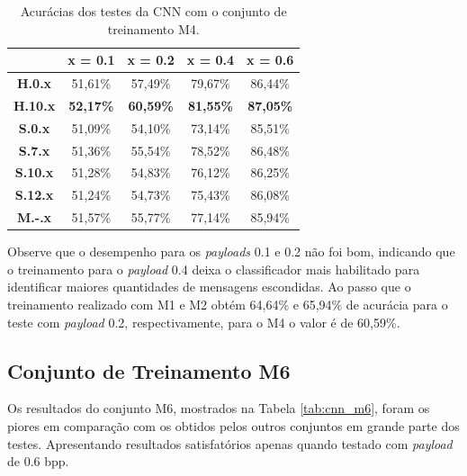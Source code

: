 \begin{table}[!htb]
\centering
\begin{tabular}{c|c|c|c|c|}
\cline{2-5}
\textbf{}                             & \textbf{x = 0.1} & \textbf{x = 0.2} & \textbf{x = 0.4} & \textbf{x = 0.6} \\ \hline
\multicolumn{1}{|c|}{\textbf{H.0.x}}  & 51,61\%          & 57,49\%          & 79,67\%          & 86,44\%          \\ \hline
\multicolumn{1}{|c|}{\textbf{H.10.x}} & \textbf{52,17\%} & \textbf{60,59\%} & \textbf{81,55\%} & \textbf{87,05\%} \\ \hline
\multicolumn{1}{|c|}{\textbf{S.0.x}}  & 51,09\%          & 54,10\%          & 73,14\%          & 85,51\%          \\ \hline
\multicolumn{1}{|c|}{\textbf{S.7.x}}  & 51,36\%          & 55,54\%          & 78,52\%          & 86,48\%          \\ \hline
\multicolumn{1}{|c|}{\textbf{S.10.x}} & 51,28\%          & 54,83\%          & 76,12\%          & 86,25\%          \\ \hline
\multicolumn{1}{|c|}{\textbf{S.12.x}} & 51,24\%          & 54,73\%          & 75,43\%          & 86,08\%          \\ \hline
\multicolumn{1}{|c|}{\textbf{M.-.x}}  & 51,57\%          & 55,77\%          & 77,14\%          & 85,94\%          \\ \hline
\end{tabular}
\caption{Acurácias dos testes da CNN com o conjunto de treinamento M4.}
\label{tab:cnn_m4}
\end{table}

Observe que o desempenho para os \textit{payloads} 0.1 e 0.2 não foi bom, indicando que o treinamento para o \textit{payload} 0.4 deixa o classificador mais habilitado para identificar maiores quantidades de mensagens escondidas. Ao passo que o treinamento realizado com M1 e M2 obtém 64,64\% e 65,94\% de acurácia para o teste com \textit{payload }0.2, respectivamente, para o M4 o valor é de 60,59\%.

\subsection{Conjunto de Treinamento M6}

Os resultados do conjunto M6, mostrados na Tabela \ref{tab:cnn_m6}, foram os piores em comparação com os obtidos pelos outros conjuntos em grande parte dos testes. Apresentando resultados satisfatórios apenas quando testado com \textit{payload} de 0.6 bpp.

